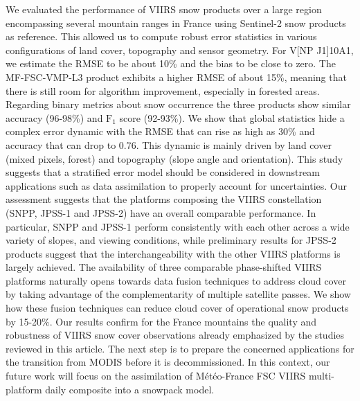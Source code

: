 \documentclass[tc, manuscript]{copernicus}
\begin{document}
We evaluated the performance of VIIRS snow products over a large region encompassing several mountain ranges in France using Sentinel-2 snow products as reference. This allowed us to compute robust error statistics in various configurations of land cover, topography and sensor geometry. For V[NP \textbar J1]10A1, we estimate the RMSE to be about 10\% and the bias to be close to zero. The MF-FSC-VMP-L3 product exhibits a higher RMSE of about 15\%, meaning that there is still room for algorithm improvement, especially in forested areas. Regarding binary metrics about snow occurrence the three products show similar accuracy (96-98\%) and $\mathrm{F_1}$ score (92-93\%). We show that global statistics hide a complex error dynamic with the RMSE that can rise as high as 30\% and accuracy that can drop to 0.76. This dynamic is mainly driven by land cover (mixed pixels, forest) and topography (slope angle and orientation). This study suggests that a stratified error model should be considered in downstream applications such as data assimilation to properly account for uncertainties. Our assessment suggests that the platforms composing the VIIRS constellation (SNPP, JPSS-1 and JPSS-2) have an overall comparable performance. In particular, SNPP and JPSS-1 perform consistently with each other across a wide variety of slopes, and viewing conditions, while preliminary results for JPSS-2 products suggest that the interchangeability with the other VIIRS platforms is largely achieved. The availability of three comparable phase-shifted VIIRS platforms naturally opens towards data fusion techniques to address cloud cover by taking advantage of the complementarity of multiple satellite passes. We show how these fusion techniques can reduce cloud cover of operational snow products by 15-20\%. Our results confirm for the France mountains the quality and robustness of VIIRS snow cover observations already emphasized by the studies reviewed in this article. The next step is to prepare the concerned applications for the transition from MODIS before it is decommissioned. In this context, our future work will focus on the assimilation of Météo-France FSC VIIRS multi-platform daily composite into a snowpack model. 





\end{document}
